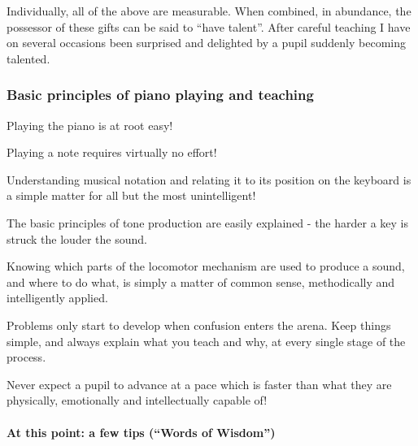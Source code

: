 \documentclass{article}
\begin{document}
Individually, all of the above are measurable.
When combined, in abundance, the possessor of these gifts can be said to ``have talent''.\footnotemark
After careful teaching I have on several occasions been surprised and delighted by a pupil suddenly becoming talented.


\subsubsection{Basic principles of piano playing and teaching}

Playing the piano is at root easy!

Playing a note requires virtually no effort!

Understanding musical notation and relating it to its position on the keyboard is a simple matter for all but the most unintelligent!

The basic principles of tone production are easily explained - the harder a key is struck the louder the sound.

Knowing which parts of the locomotor mechanism are used to produce a sound, and where to do what, is simply a matter of common sense, methodically and intelligently applied.

Problems only start to develop when confusion enters the arena.
Keep things simple, and always explain what you teach and why, at every single stage of the process.\footnotemark


Never expect a pupil to advance at a pace which is faster than what they are physically, emotionally and intellectually capable of!

\paragraph{At this point: a few tips (``Words of Wisdom'')\newline\newline}
\end{document}
